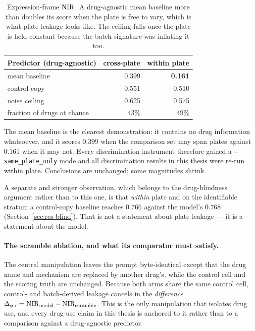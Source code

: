 \begin{table}[h]
\centering
\begin{tabular}{lrr}
\toprule
Predictor (drug-agnostic) & cross-plate & within plate \\
\midrule
mean baseline & 0.399 & \textbf{0.161} \\
control-copy & 0.551 & 0.510 \\
\midrule
noise ceiling & 0.625 & 0.575 \\
fraction of drugs at chance & 43\% & 49\% \\
\bottomrule
\end{tabular}
\caption{Expression-frame $\textrm{NIR}$. A drug-agnostic mean baseline more than doubles its score when the
plate is free to vary, which is what plate leakage looks like. The ceiling falls once the plate is
held constant because the batch signature was inflating it too.}
\label{tab:plateleak}
\end{table}

The mean baseline is the clearest demonstration: it contains no drug information whatsoever, and it
scores $0.399$ when the comparison set may span plates against $0.161$ when it may not. Every
discrimination instrument therefore gained a \texttt{--same\_plate\_only} mode and all discrimination
results in this thesis were re-run within plate. Conclusions are unchanged; some magnitudes shrink.

A separate and stronger observation, which belongs to the drug-blindness argument rather than to this
one, is that \emph{within} plate and on the identifiable stratum a control-copy baseline reaches
$0.766$ against the model's $0.768$ (Section~\ref{sec:res-blind}). That is not a statement about
plate leakage --- it is a statement about the model.

\paragraph{The scramble ablation, and what its comparator must satisfy.} The central manipulation
leaves the prompt byte-identical except that the drug name and mechanism are replaced by another
drug's, while the control cell and the scoring truth are unchanged. Because both arms share the
same control cell, control- and batch-derived leakage cancels in the \emph{difference}
$\Delta_{\textrm{scr}} = \textrm{NIR}_{\textrm{model}} - \textrm{NIR}_{\textrm{scramble}}$. This is the only manipulation that
isolates drug use, and every drug-use claim in this thesis is anchored to it rather than to a
comparison against a drug-agnostic predictor.


